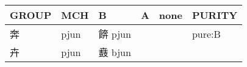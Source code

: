 \documentclass[14pt,a4paper]{scrartcl}
\begin{document}
\begin{longtable}[c]{@{}llllll@{}}
\toprule
\begin{minipage}[b]{0.14\columnwidth}\raggedright\strut
GROUP
\strut\end{minipage} &
\begin{minipage}[b]{0.14\columnwidth}\raggedright\strut
MCH
\strut\end{minipage} &
\begin{minipage}[b]{0.14\columnwidth}\raggedright\strut
B
\strut\end{minipage} &
\begin{minipage}[b]{0.14\columnwidth}\raggedright\strut
A
\strut\end{minipage} &
\begin{minipage}[b]{0.14\columnwidth}\raggedright\strut
none
\strut\end{minipage} &
\begin{minipage}[b]{0.14\columnwidth}\raggedright\strut
PURITY
\strut\end{minipage}\tabularnewline
\midrule
\endhead
\begin{minipage}[t]{0.14\columnwidth}\raggedright\strut
奔
\strut\end{minipage} &
\begin{minipage}[t]{0.14\columnwidth}\raggedright\strut
pjun
\strut\end{minipage} &
\begin{minipage}[t]{0.14\columnwidth}\raggedright\strut
餴 pjun
\strut\end{minipage} &
\begin{minipage}[t]{0.14\columnwidth}\raggedright\strut
\strut\end{minipage} &
\begin{minipage}[t]{0.14\columnwidth}\raggedright\strut
\strut\end{minipage} &
\begin{minipage}[t]{0.14\columnwidth}\raggedright\strut
pure:B
\strut\end{minipage}\tabularnewline
\begin{minipage}[t]{0.14\columnwidth}\raggedright\strut
卉
\strut\end{minipage} &
\begin{minipage}[t]{0.14\columnwidth}\raggedright\strut
pjun
\strut\end{minipage} &
\begin{minipage}[t]{0.14\columnwidth}\raggedright\strut
鼖 bjun
\strut\end{minipage} &
\begin{minipage}[t]{0.14\columnwidth}\raggedright\strut

\end{minipage}
\end{longtable}
\end{document}
